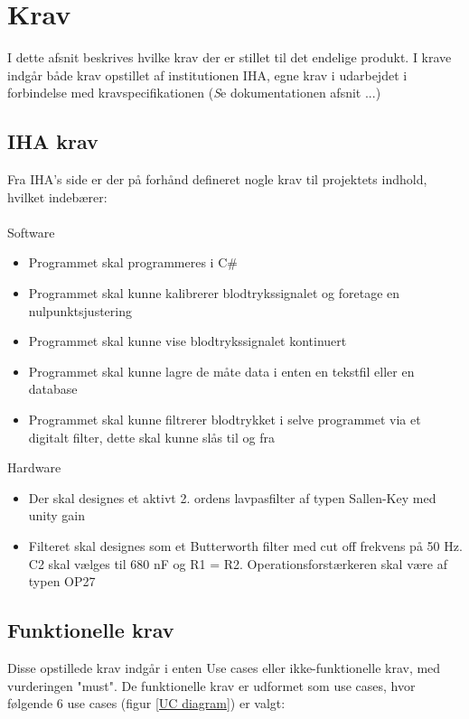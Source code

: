 \chapter{Krav}
I dette afsnit beskrives hvilke krav der er stillet til det endelige produkt. I krave indgår både krav opstillet af institutionen IHA, egne krav i udarbejdet i forbindelse med kravspecifikationen  (\textit Se dokumentationen afsnit ...) 
\section{IHA krav}
Fra IHA’s side er der på forhånd defineret nogle krav til projektets indhold, hvilket indebærer:\\ \\
Software 
\begin{itemize}
	\item Programmet skal programmeres i C\#
	\item Programmet skal kunne kalibrerer blodtrykssignalet og foretage en nulpunktsjustering
	\item Programmet skal kunne vise blodtrykssignalet kontinuert
	\item Programmet skal kunne lagre de måte data i enten en tekstfil eller en database
	\item Programmet skal kunne filtrerer blodtrykket i selve programmet via et digitalt filter, dette skal kunne slås til og fra
\end{itemize}

Hardware
\begin{itemize}
	\item Der skal designes et aktivt 2. ordens lavpasfilter af typen Sallen-Key med unity gain
	\item Filteret skal designes som et Butterworth filter med cut off frekvens på 50 Hz. C2 skal vælges til 680 nF og R1 = R2. Operationsforstærkeren skal være af typen OP27
\end{itemize}

\section{Funktionelle krav}
Disse opstillede krav indgår i enten Use cases eller ikke-funktionelle krav, med vurderingen "must". De funktionelle krav er udformet som use cases, hvor følgende 6 use cases (figur \ref{UC diagram}) er valgt:

